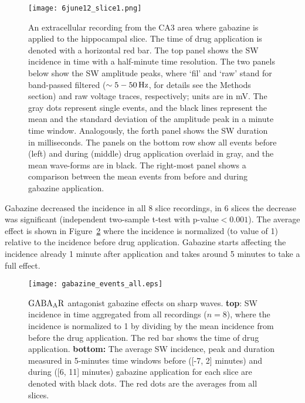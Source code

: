     \begin{figure}
      \texttt{[image: 6june12\_slice1.png]}
      \caption{
        An extracellular recording from the CA3 area where gabazine is applied to
        the hippocampal slice. The time of drug application is denoted with a
        horizontal red bar. The top panel shows the SW incidence in time with a
        half-minute time resolution. The two panels below show the SW amplitude
        peaks, where `fil' and `raw' stand for band-passed filtered ($\sim
        5-50\, \rm Hz$, for details see the Methods section) and raw voltage
        traces, respectively; units are in mV. The gray dots represent single
        events, and the black lines represent the mean and the standard
        deviation of the amplitude peak in a minute time window. Analogously,
        the forth panel shows the SW duration in milliseconds. The panels on
        the bottom row show all events before (left) and during (middle) drug
        application overlaid in gray, and the mean wave-forms are in black. The
        right-most panel shows a comparison between the mean events from before
        and during gabazine application.
      }
      \label{fig:gabazine_ex}
    \end{figure}


    Gabazine decreased the incidence in all 8 slice recordings, in 6 slices the
    decrease was significant (independent two-sample t-test with
    p-value$<0.001$). The average effect is shown in
    Figure~\ref{fig:gabazine_sum} where the incidence is normalized (to value
    of 1) relative to the incidence before drug application. Gabazine starts
    affecting the incidence already 1 minute after application and takes around
    5 minutes to take a full effect. 
    
    \begin{figure}
      \texttt{[image: gabazine\_events\_all.eps]}
      \caption{
        $\rm GABA_AR$ antagonist gabazine effects on sharp waves. {\bf top}: SW
        incidence in time aggregated from all recordings ($n=8$), where the
        incidence is normalized to 1 by dividing by the mean incidence from before
        the drug application. The red bar shows the time of drug application.
        {\bf bottom:} The average SW incidence, peak and duration measured in
        5-minutes time windows before ([-7, 2] minutes) and during ([6, 11]
        minutes) gabazine application for each slice are denoted with black
        dots. The red dots are the averages from all slices.
      }
      \label{fig:gabazine_sum}
    \end{figure}

